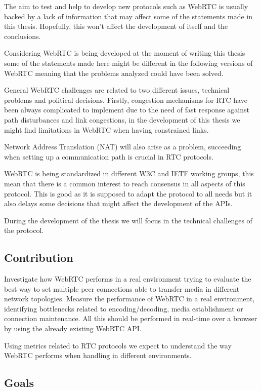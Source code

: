 The aim to test and help to develop new protocols such as WebRTC is usually backed by a lack of information that may affect some of the statements made in this thesis. Hopefully, this won't affect the development of itself and the conclusions. 

Considering WebRTC is being developed at the moment of writing this thesis some of the statements made here might be different in the following versions of WebRTC meaning that the problems analyzed could have been solved.

General WebRTC challenges are related to two different issues, technical problems and political decisions. Firstly, congestion mechanisms for RTC have been always complicated to implement due to the need of fast response against path disturbances and link congestions, in the development of this thesis we might find limitations in WebRTC when having constrained links.

Network Address Translation (NAT)  will also arise as a problem, succeeding when setting up a communication path is crucial in RTC protocols.

WebRTC is being standardized in different W3C and IETF working groups, this mean that there is a common interest to reach consensus in all aspects of this protocol. This is good as it is supposed to adapt the protocol to all needs but it also delays some decisions that might affect the development of the APIs.

During the development of the thesis we will focus in the technical challenges of the protocol.

\subsection{Contribution}

Investigate how WebRTC performs in a real environment trying to evaluate the best way to set multiple peer connections able to transfer media in different network topologies. Measure the performance of WebRTC in a real environment, identifying bottlenecks related to encoding/decoding, media establishment or connection maintenance. All this should be performed in real-time over a browser by using the already existing WebRTC API.

Using metrics related to RTC protocols we expect to understand the way WebRTC performs when handling in different environments.

\subsection{Goals}

